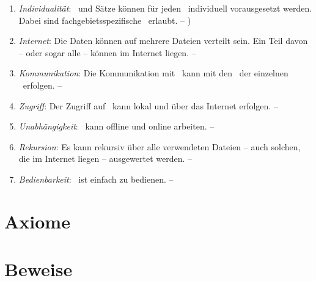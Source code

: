 \begin{enumerate}
	\item \label{Anforderung-Individualitaet} \emph{Individualität}:
	\Axiome\ und Sätze können für jeden \Beweis\ individuell vorausgesetzt werden.
	Dabei sind fachgebietsspezifische \Fachbegriffe\ erlaubt.
	-- )

	\item \label{Anforderung-Internet} \emph{Internet}:
	Die Daten können auf mehrere Dateien verteilt sein.
	Ein Teil davon -- oder sogar alle -- können im Internet liegen.
	-- 

	\item \label{Anforderung-Kommunikation} \emph{Kommunikation}:
	Die Kommunikation mit \ASBA\ kann mit den \Fachbegriffen\ der einzelnen \Fachgebiete\ erfolgen.
	-- 

	\item \label{Anforderung-Zugriff} \emph{Zugriff}:
	Der Zugriff auf \ASBA\ kann lokal und über das Internet erfolgen.
	-- 

	\item \label{Anforderung-Unabhaengigkeit} \emph{Unabhängigkeit}:
	\ASBA\ kann offline und online arbeiten.
	-- 

	\item \label{Anforderung-Rekursion} \emph{Rekursion}:
	Es kann rekursiv über alle verwendeten Dateien -- auch solchen, die im Internet liegen -- ausgewertet werden.
	-- 

	\item \label{Anforderung-Bedienbarkeit} \emph{Bedienbarkeit}:
	\ASBA\ ist einfach zu bedienen.
	-- 

\end{enumerate}

\section{Axiome}%
\beginsection{\Axiome}
\label{sec-Axiome}

\section{Beweise}%
\beginsection{\Beweise}
\label{sec-Beweise}

